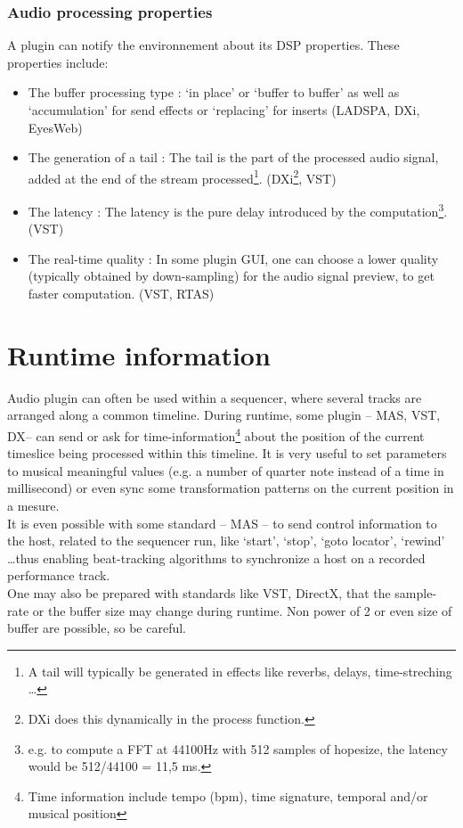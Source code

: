 \subsubsection{Audio processing properties}
\noindent A plugin can notify the environnement about its DSP properties. These properties include:
\begin{itemize}
\item{The buffer processing type :} `in place' or `buffer to buffer' as well as `accumulation' for send effects or `replacing' for inserts (LADSPA, DXi, EyesWeb)
\item{The generation of a tail :} The tail is the part of the processed audio signal, added at the end of the stream processed\footnote{A tail will typically be generated in effects like reverbs, delays, time-streching \ldots }. (DXi\footnote{DXi does this dynamically in the process function.}, VST)
\item{The latency :} The latency is the pure delay introduced by the computation\footnote{e.g. to compute a FFT at 44100Hz with 512 samples of hopesize, the latency would be 512/44100 = 11,5 ms.}. (VST)
\item{The real-time quality :} In some plugin GUI, one can choose a lower quality (typically obtained by down-sampling) for the audio signal preview, to get faster computation. (VST, RTAS)
\end{itemize}


\section{Runtime information}
\noindent Audio plugin can often be used within a sequencer, where several tracks are arranged along a common timeline. During runtime, some plugin -- MAS, VST, DX-- can send or ask for time-information\footnote{Time information include tempo (bpm), time signature, temporal and/or musical position } about the position of the current timeslice being processed within this timeline. It is very useful to set parameters to musical meaningful values (e.g. a number of quarter note instead of a time in millisecond) or even sync some transformation patterns on the current position in a mesure.\\
It is even possible with some standard -- MAS -- to send control information to the host, related to the sequencer run, like `start', `stop', `goto locator', `rewind' \ldots thus enabling beat-tracking algorithms to synchronize a host on a recorded performance track.\\
\noindent One may also be prepared with standards like VST, DirectX, that the sample-rate or the buffer size may change during runtime. Non power of 2 or even size of buffer are possible, so be careful.


